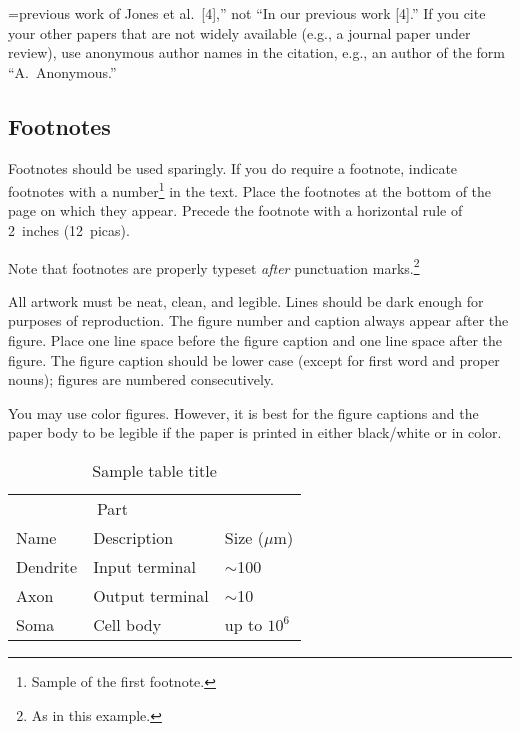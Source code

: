 \documentclass{article}
\begin{document}
=previous work of Jones et al.\ [4],'' not ``In our
previous work [4].'' If you cite your other papers that are not widely available
(e.g., a journal paper under review), use anonymous author names in the
citation, e.g., an author of the form ``A.\ Anonymous.''

\subsection{Footnotes}

Footnotes should be used sparingly.  If you do require a footnote, indicate
footnotes with a number\footnote{Sample of the first footnote.} in the
text. Place the footnotes at the bottom of the page on which they appear.
Precede the footnote with a horizontal rule of 2~inches (12~picas).

Note that footnotes are properly typeset \emph{after} punctuation
marks.\footnote{As in this example.}



All artwork must be neat, clean, and legible. Lines should be dark enough for
purposes of reproduction. The figure number and caption always appear after the
figure. Place one line space before the figure caption and one line space after
the figure. The figure caption should be lower case (except for first word and
proper nouns); figures are numbered consecutively.

You may use color figures.  However, it is best for the figure captions and the
paper body to be legible if the paper is printed in either black/white or in
color.



\begin{table}
  \caption{Sample table title}
  \label{sample-table}
  \centering
  \begin{tabular}{lll}
    \toprule
    \multicolumn{2}{c}{Part}                   \\
    \cmidrule(r){1-2}
    Name     & Description     & Size ($\mu$m) \\
    \midrule
    Dendrite & Input terminal  & $\sim$100     \\
    Axon     & Output terminal & $\sim$10      \\
    Soma     & Cell body       & up to $10^6$  \\
    \bottomrule
  \end{tabular}
\end{table}
\end{document}
